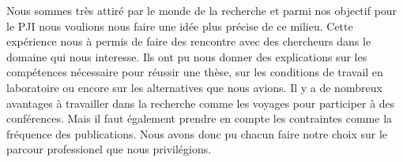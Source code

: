 Nous sommes très attiré par le monde de la recherche et parmi nos objectif pour le PJI nous voulions 
nous faire une idée plus précise de ce milieu. Cette expérience nous à permis de faire des rencontre
avec des chercheurs dans le domaine qui nous interesse. Ils ont pu nous donner des explications
sur les compétences nécessaire pour réussir une thèse, sur les conditions de travail en laboratoire 
ou encore sur les alternatives que nous avions. Il y a de nombreux avantages à travailler dans la recherche
comme les voyages pour participer à des conférences. Mais il faut également prendre en compte les contraintes
comme la fréquence des publications. Nous avons donc pu chacun faire notre choix sur le parcour professionel
que nous privilégions.\\




\newpage